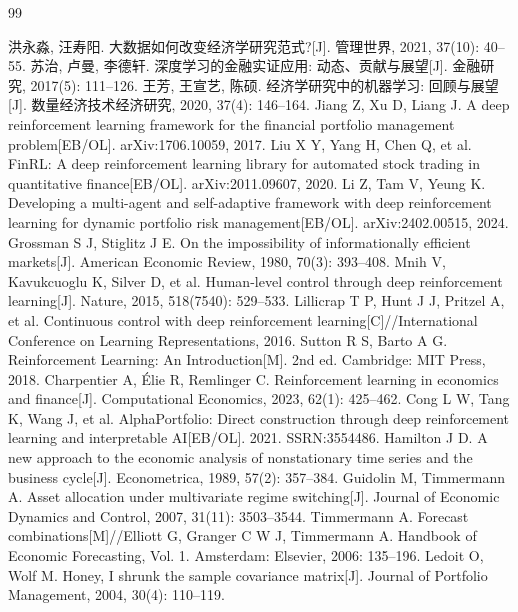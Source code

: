 \begin{thebibliography}{99}
\footnotesize
\setlength{\itemsep}{0.1em}

 洪永淼, 汪寿阳. 大数据如何改变经济学研究范式?[J]. 管理世界, 2021, 37(10): 40--55.
 苏治, 卢曼, 李德轩. 深度学习的金融实证应用: 动态、贡献与展望[J]. 金融研究, 2017(5): 111--126.
 王芳, 王宣艺, 陈硕. 经济学研究中的机器学习: 回顾与展望[J]. 数量经济技术经济研究, 2020, 37(4): 146--164.
 Jiang Z, Xu D, Liang J. A deep reinforcement learning framework for the financial portfolio management problem[EB/OL]. arXiv:1706.10059, 2017.
 Liu X Y, Yang H, Chen Q, et al. FinRL: A deep reinforcement learning library for automated stock trading in quantitative finance[EB/OL]. arXiv:2011.09607, 2020.
 Li Z, Tam V, Yeung K. Developing a multi-agent and self-adaptive framework with deep reinforcement learning for dynamic portfolio risk management[EB/OL]. arXiv:2402.00515, 2024.
 Grossman S J, Stiglitz J E. On the impossibility of informationally efficient markets[J]. American Economic Review, 1980, 70(3): 393--408.
 Mnih V, Kavukcuoglu K, Silver D, et al. Human-level control through deep reinforcement learning[J]. Nature, 2015, 518(7540): 529--533.
 Lillicrap T P, Hunt J J, Pritzel A, et al. Continuous control with deep reinforcement learning[C]//International Conference on Learning Representations, 2016.
 Sutton R S, Barto A G. Reinforcement Learning: An Introduction[M]. 2nd ed. Cambridge: MIT Press, 2018.
 Charpentier A, Élie R, Remlinger C. Reinforcement learning in economics and finance[J]. Computational Economics, 2023, 62(1): 425--462.
 Cong L W, Tang K, Wang J, et al. AlphaPortfolio: Direct construction through deep reinforcement learning and interpretable AI[EB/OL]. 2021. SSRN:3554486.
 Hamilton J D. A new approach to the economic analysis of nonstationary time series and the business cycle[J]. Econometrica, 1989, 57(2): 357--384.
 Guidolin M, Timmermann A. Asset allocation under multivariate regime switching[J]. Journal of Economic Dynamics and Control, 2007, 31(11): 3503--3544.
 Timmermann A. Forecast combinations[M]//Elliott G, Granger C W J, Timmermann A. Handbook of Economic Forecasting, Vol. 1. Amsterdam: Elsevier, 2006: 135--196.
 Ledoit O, Wolf M. Honey, I shrunk the sample covariance matrix[J]. Journal of Portfolio Management, 2004, 30(4): 110--119.

\end{thebibliography}
